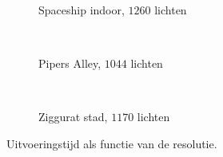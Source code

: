 \begin{figure}[t]
\begin{minipage}[t]{0.5\textwidth}
  \label{fig:fds-test-lights}
  \end{minipage} %
  \begin{minipage}[t]{0.5\textwidth}
  \begin{adjustbox}{minipage=\textwidth, scale=0.6}
    \begin{subfigure}[b]{1.6\textwidth}
      \centering
      \def\svgwidth{\textwidth}
      
      \caption{Spaceship indoor, $1260$ lichten}
      \vspace{4pt}
      \label{fig:fds-test-resolution:indoor}
    \end{subfigure}
  \end{adjustbox} \\
  \begin{adjustbox}{minipage=\textwidth, scale=0.6}
    \begin{subfigure}[b]{1.6\textwidth}
      \centering
      \def\svgwidth{\textwidth}
      
      \caption{Pipers Alley, $1044$ lichten}
      \vspace{4pt}
      \label{fig:fds-test-resolution:alley}
    \end{subfigure}
  \end{adjustbox} \\
  \begin{adjustbox}{minipage=\textwidth, scale=0.6}
    \begin{subfigure}[b]{1.6\textwidth}
      \centering
      \def\svgwidth{\textwidth}
      
      \caption{Ziggurat stad, $1170$ lichten}
      \label{fig:fds-test-resolution:city}
    \end{subfigure}
  \end{adjustbox}
  \caption{\small Uitvoeringstijd als functie van de resolutie. }
  \label{fig:fds-test-resolution}
  \end{minipage}
\end{figure}

